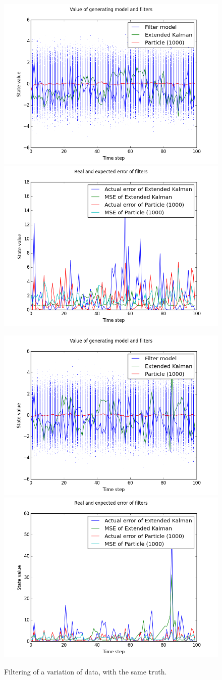\documentclass[paper=a4, fontsize=11pt]{scrartcl} %
\numberwithin{equation}{section} %
\numberwithin{figure}{section} %
\numberwithin{table}{section} %
\begin{document}
\begin{figure}
\centerline{
\includegraphics[width=.7\textwidth]{fig/figure_17}
\includegraphics[width=.7\textwidth]{fig/figure_18}}
\centerline{
\includegraphics[width=.7\textwidth]{fig/figure_19}
\includegraphics[width=.7\textwidth]{fig/figure_20}}
\caption{Filtering of a variation of data, with the same truth.}\label{fig:6}
\end{figure}
\end{document}

